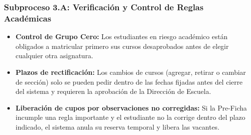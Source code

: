 \subsubsection{Subproceso 3.A: Verificación y Control de Reglas Académicas}

\begin{itemize}
    \item \textbf{Control de Grupo Cero:} Los estudiantes en riesgo académico están obligados a matricular primero sus cursos desaprobados antes de elegir cualquier otra asignatura.

    \item \textbf{Plazos de rectificación:} Los cambios de cursos (agregar, retirar o cambiar de sección) solo se pueden pedir dentro de las fechas fijadas antes del cierre del sistema y requieren la aprobación de la Dirección de Escuela.

    \item \textbf{Liberación de cupos por observaciones no corregidas:} Si la Pre-Ficha incumple una regla importante y el estudiante no la corrige dentro del plazo indicado, el sistema anula su reserva temporal y libera las vacantes.
\end{itemize}
